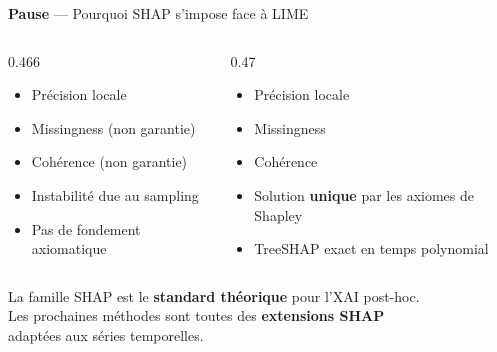 \documentclass[10pt]{beamer}
\begin{document}
\begin{frame}{\textbf{Pause} --- Pourquoi SHAP s'impose face à LIME}
  \begin{columns}
    \begin{column}{0.466\textwidth}
      \begin{tcolorbox}[
        colback=red!3, colframe=red!60!black,
        arc=2mm, boxrule=0.5pt, fonttitle=\bfseries,
        title={LIME}]
        \begin{itemize}
          \item[\checkmark] Précision locale
          \item[$\times$] Missingness (non garantie)
          \item[$\times$] Cohérence (non garantie)
          \item[$\times$] Instabilité due au sampling
          \item[$\times$] Pas de fondement axiomatique
        \end{itemize}
      \end{tcolorbox}
    \end{column}
    \begin{column}{0.47\textwidth}
      \begin{tcolorbox}[
        colback=green!3, colframe=green!40!black,
        arc=2mm, boxrule=0.5pt, fonttitle=\bfseries,
        title={SHAP (KernelSHAP)}]
        \begin{itemize}
          \item[\checkmark] Précision locale
          \item[\checkmark] Missingness
          \item[\checkmark] Cohérence
          \item[\checkmark] Solution \textbf{unique} par les axiomes de Shapley
          \item[\checkmark] TreeSHAP exact en temps polynomial
        \end{itemize}
      \end{tcolorbox}
    \end{column}
  \end{columns}

  \vspace{6pt}
  \begin{tcolorbox}[
    colback=blue!3, colframe=blue!40!black,
    arc=2mm, boxrule=0.5pt, fonttitle=\bfseries,
    title={Conclusion de cette pause}]
    \centering
    La famille SHAP est le \textbf{standard théorique} pour l'XAI post-hoc.\\
    Les prochaines méthodes sont toutes des \textbf{extensions SHAP}\\
    adaptées aux séries temporelles.
  \end{tcolorbox}
\end{frame}
\end{document}
